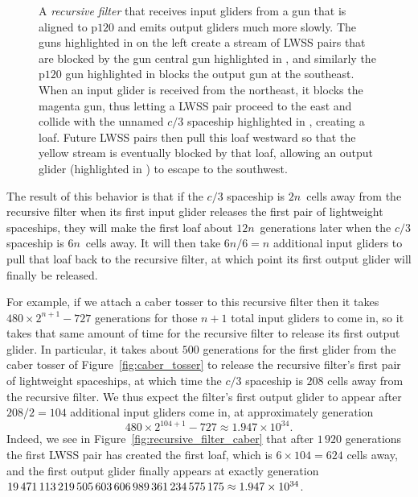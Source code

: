 \begin{figure}[!htb]
	\centering
	\caption{A \emph{recursive filter} that receives input gliders from a gun that is aligned to p$120$ and emits output gliders much more slowly. The guns highlighted in  on the left create a stream of LWSS pairs that are blocked by the gun central gun highlighted in , and similarly the p$120$ gun highlighted in  blocks the output gun at the southeast. When an input glider is received from the northeast, it blocks the magenta gun, thus letting a LWSS pair proceed to the east and collide with the unnamed $c/3$ spaceship highlighted in , creating a loaf. Future LWSS pairs then pull this loaf westward so that the yellow stream is eventually blocked by that loaf, allowing an output glider (highlighted in ) to escape to the southwest.}\label{fig:recursive_filter}
\end{figure}


The result of this behavior is that if the $c/3$ spaceship is $2n$~cells away from the recursive filter when its first input glider releases the first pair of lightweight spaceships, they will make the first loaf about $12n$~generations later when the $c/3$ spaceship is $6n$~cells away. It will then take $6n/6 = n$ additional input gliders to pull that loaf back to the recursive filter, at which point its first output glider will finally be released.

For example, if we attach a caber tosser to this recursive filter then it takes $480 \times 2^{n+1} - 727$ generations for those $n+1$ total input gliders to come in, so it takes that same amount of time for the recursive filter to release its first output glider. In particular, it takes about $500$ generations for the first glider from the caber tosser of Figure~\ref{fig:caber_tosser} to release the recursive filter's first pair of lightweight spaceships, at which time the $c/3$ spaceship is $208$ cells away from the recursive filter. We thus expect the filter's first output glider to appear after $208/2 = 104$ additional input gliders come in, at approximately generation
\[
480 \times 2^{104 + 1} - 727 \approx 1.947 \times 10^{34}.
\]
Indeed, we see in Figure~\ref{fig:recursive_filter_caber} that after $1\, 920$ generations the first LWSS pair has created the first loaf, which is $6 \times 104 = 624$ cells away, and the first output glider finally appears at exactly generation $19{\,}471{\,}113{\,}219{\,}505{\,}603{\,}606{\,}989{\,}361{\,}234{\,}575{\,}175 \approx 1.947 \times 10^{34}$.

